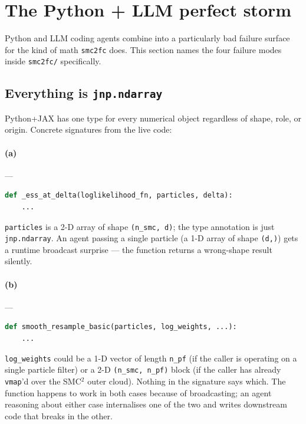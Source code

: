 \documentclass[11pt,a4paper]{article}
\begin{document}
\section{The Python + LLM perfect storm}
\label{sec:storm}

Python and LLM coding agents combine into a particularly bad
failure surface for the kind of math \texttt{smc2fc} does. This
section names the four failure modes inside \texttt{smc2fc/}
specifically.

\subsection{Everything is \texttt{jnp.ndarray}}
\label{sec:storm-ndarray}

Python+JAX has one type for every numerical object regardless of
shape, role, or origin. Concrete signatures from the live code:

\paragraph{(a)}  ---
\begin{lstlisting}[language=Python]
def _ess_at_delta(loglikelihood_fn, particles, delta):
    ...
\end{lstlisting}
\texttt{particles} is a 2-D array of shape \texttt{(n\_smc, d)}; the
type annotation is just \texttt{jnp.ndarray}. An agent passing a
single particle (a 1-D array of shape \texttt{(d,)}) gets a
runtime broadcast surprise --- the function returns a wrong-shape
result silently.

\paragraph{(b)}  ---
\begin{lstlisting}[language=Python]
def smooth_resample_basic(particles, log_weights, ...):
    ...
\end{lstlisting}
\texttt{log\_weights} could be a 1-D vector of length \texttt{n\_pf}
(if the caller is operating on a single particle filter) or a 2-D
\texttt{(n\_smc, n\_pf)} block (if the caller has already
\texttt{vmap}'d over the SMC$^2$ outer cloud). Nothing in the
signature says which. The function happens to work in both cases
because of broadcasting; an agent reasoning about either case
internalises one of the two and writes downstream code that breaks
in the other.
\end{document}
